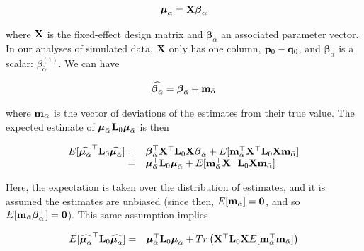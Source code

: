 \documentclass[12pt]{article}
\begin{document}
\begin{bibunit}
\begin{equation} 
\boldsymbol{\mu}_{\bar{\alpha}} = {\bf X}{\boldsymbol \beta}_{\bar{\alpha}}
\end{equation} 

where ${\bf X}$ is the fixed-effect design matrix and ${\boldsymbol \beta}_{\bar{\alpha}}$ an associated parameter vector. In our analyses of simulated data, ${\bf X}$ only has one column, ${\bf p}_{0}-{\bf q}_{0}$, and ${\boldsymbol \beta}_{\bar{\alpha}}$ is a scalar: $\beta^{(1)}_{\bar{\alpha}}$. We can have

\begin{equation} 
\widehat{{\boldsymbol \beta}_{\bar{\alpha}}} = {\boldsymbol \beta}_{\bar{\alpha}}+{\bf m}_{\bar{\alpha}}
\end{equation}

where  ${\bf m}_{\bar{\alpha}}$ is the vector of deviations of the estimates from their true value.  The expected estimate of $\boldsymbol{\mu}_{\bar{\alpha}}^{\top}{\bf L}_0\boldsymbol{\mu}_{\bar{\alpha}}$ is then

\begin{equation}
\begin{array}{rl}
E[\widehat{\boldsymbol{\mu}_{\bar{\alpha}}}^{\top}{\bf L}_0\widehat{\boldsymbol{\mu}_{\bar{\alpha}}}]=& {\boldsymbol \beta}_{\bar{\alpha}}^{\top}{\bf X}^{\top}{\bf L}_0{\bf X}{\boldsymbol \beta}_{\bar{\alpha}}+E[{\bf m}_{\bar{\alpha}}^{\top}{\bf X}^{\top}{\bf L}_0{\bf X}{\bf m}_{\bar{\alpha}}]\\
=& \boldsymbol{\mu}_{\bar{\alpha}}^{\top}{\bf L}_0\boldsymbol{\mu}_{\bar{\alpha}}+E[{\bf m}_{\bar{\alpha}}^{\top}{\bf X}^{\top}{\bf L}_0{\bf X}{\bf m}_{\bar{\alpha}}]\\

\end{array}
\end{equation} 

Here, the expectation is taken over the distribution of estimates, and it is assumed the estimates are unbiased (since then, $E[{\bf m}_{\bar{\alpha}}]={\bf 0}$, and so $E[{\bf m}_{\bar{\alpha}}{\boldsymbol \beta}_{\bar{\alpha}}^{\top}]={\bf 0}$). This same assumption implies


\begin{equation}
\begin{array}{rl}
E[\widehat{\boldsymbol{\mu}_{\bar{\alpha}}}^{\top}{\bf L}_0\widehat{\boldsymbol{\mu}_{\bar{\alpha}}}]=& \boldsymbol{\mu}_{\bar{\alpha}}^{\top}{\bf L}_0\boldsymbol{\mu}_{\bar{\alpha}}+Tr\left({\bf X}^{\top}{\bf L}_0{\bf X}E[{\bf m}_{\bar{\alpha}}^{\top}{\bf m}_{\bar{\alpha}}]\right)\\
\end{array}
\end{equation} 


\end{bibunit}
\end{document}
